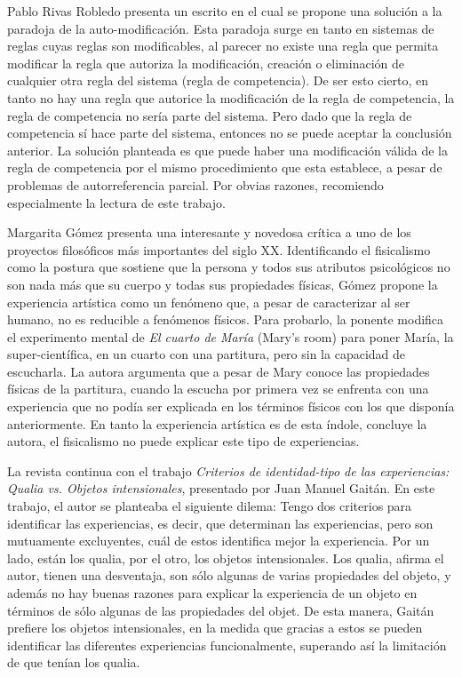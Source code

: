 \documentclass[]{book}
\begin{document}
Pablo Rivas Robledo presenta un escrito en el cual se propone una
solución a la paradoja de la auto-modificación. Esta paradoja surge en
tanto en sistemas de reglas cuyas reglas son modificables, al parecer no
existe una regla que permita modificar la regla que autoriza la
modificación, creación o eliminación de cualquier otra regla del sistema
(regla de competencia). De ser esto cierto, en tanto no hay una regla
que autorice la modificación de la regla de competencia, la regla de
competencia no sería parte del sistema. Pero dado que la regla de
competencia sí hace parte del sistema, entonces no se puede aceptar la
conclusión anterior. La solución planteada es que puede haber una
modificación válida de la regla de competencia por el mismo
procedimiento que esta establece, a pesar de problemas de
autorreferencia parcial. Por obvias razones, recomiendo especialmente la
lectura de este trabajo.

Margarita Gómez presenta una interesante y novedosa crítica a uno de los
proyectos filosóficos más importantes del siglo XX. Identificando el
fisicalismo como la postura que sostiene que la persona y todos sus
atributos psicológicos no son nada más que su cuerpo y todas sus
propiedades físicas, Gómez propone la experiencia artística como un
fenómeno que, a pesar de caracterizar al ser humano, no es reducible a
fenómenos físicos. Para probarlo, la ponente modifica el experimento
mental de \emph{El cuarto de María} (Mary's room) para poner María, la
super-científica, en un cuarto con una partitura, pero sin la capacidad
de escucharla. La autora argumenta que a pesar de Mary conoce las
propiedades físicas de la partitura, cuando la escucha por primera vez
se enfrenta con una experiencia que no podía ser explicada en los
términos físicos con los que disponía anteriormente. En tanto la
experiencia artística es de esta índole, concluye la autora, el
fisicalismo no puede explicar este tipo de experiencias.

La revista continua con el trabajo \emph{Criterios de identidad-tipo de
las experiencias: Qualia vs. Objetos intensionales}, presentado por Juan
Manuel Gaitán. En este trabajo, el autor se planteaba el siguiente
dilema: Tengo dos criterios para identificar las experiencias, es decir,
que determinan las experiencias, pero son mutuamente excluyentes, cuál
de estos identifica mejor la experiencia. Por un lado, están los qualia,
por el otro, los objetos intensionales. Los qualia, afirma el autor,
tienen una desventaja, son sólo algunas de varias propiedades del
objeto, y además no hay buenas razones para explicar la experiencia de
un objeto en términos de sólo algunas de las propiedades del objet. De
esta manera, Gaitán prefiere los objetos intensionales, en la medida que
gracias a estos se pueden identificar las diferentes experiencias
funcionalmente, superando así la limitación de que tenían los qualia.
\end{document}
